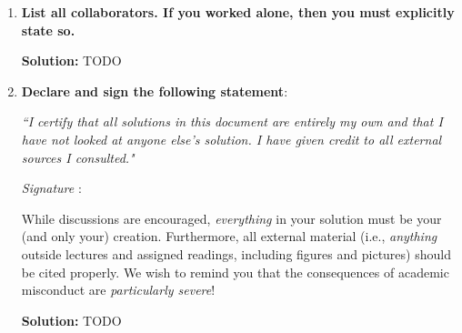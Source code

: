 \documentclass{article}
\newenvironment{solution}{\color{blue} \smallskip \textbf{Solution:}}{}
\begin{document}
\begin{enumerate}
    \item 
    \textbf{List all collaborators. If you worked alone, then you must explicitly state so.}

    \begin{solution}
        TODO
    \end{solution}

    \item
    \textbf{Declare and sign the following statement}: 
    
    \textit{``I certify that all solutions in this document are entirely my own and that I have not looked at anyone else's solution. I have given credit to all external sources I consulted."}
    
    \textit{Signature} : \hrulefill
    
    While discussions are encouraged, \emph{everything} in your solution must be your (and only your) creation. 
    Furthermore, all external material  (i.e., \emph{anything} outside lectures and assigned
    readings, including figures and pictures) should be cited properly.
    We wish to remind you that the consequences of academic misconduct are \emph{particularly severe}!

    \begin{solution}
        TODO
    \end{solution}

\end{enumerate}
\end{document}
